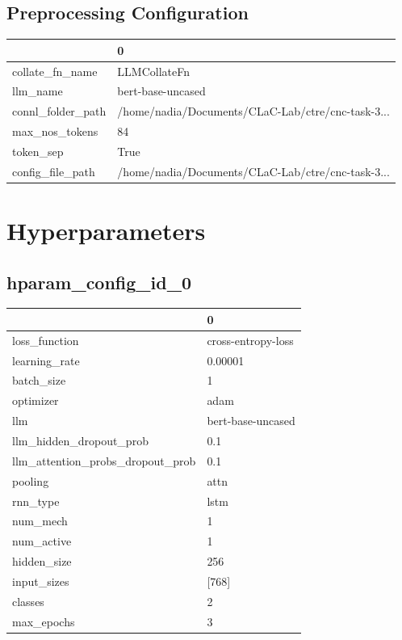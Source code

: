 \documentclass{article}
\begin{document}
\subsection{Preprocessing Configuration}
\begin{tabular}{ll}
\toprule
{} &                                                  0 \\
\midrule
collate\_fn\_name   &                                       LLMCollateFn \\
llm\_name          &                                  bert-base-uncased \\
connl\_folder\_path &  /home/nadia/Documents/CLaC-Lab/ctre/cnc-task-3... \\
max\_nos\_tokens    &                                                 84 \\
token\_sep         &                                               True \\
config\_file\_path  &  /home/nadia/Documents/CLaC-Lab/ctre/cnc-task-3... \\
\bottomrule
\end{tabular}

\section{Hyperparameters}
\subsection{hparam\_config\_id\_0}
\begin{tabular}{ll}
\toprule
{} &                   0 \\
\midrule
loss\_function                    &  cross-entropy-loss \\
learning\_rate                    &             0.00001 \\
batch\_size                       &                   1 \\
optimizer                        &                adam \\
llm                              &   bert-base-uncased \\
llm\_hidden\_dropout\_prob          &                 0.1 \\
llm\_attention\_probs\_dropout\_prob &                 0.1 \\
pooling                          &                attn \\
rnn\_type                         &                lstm \\
num\_mech                         &                   1 \\
num\_active                       &                   1 \\
hidden\_size                      &                 256 \\
input\_sizes                      &               [768] \\
classes                          &                   2 \\
max\_epochs                       &                   3 \\
\bottomrule
\end{tabular}
\end{document}

